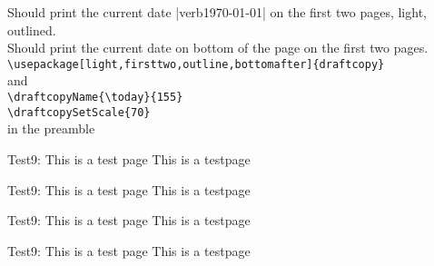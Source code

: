\documentclass[a5paper]{article}
\newcommand{\xx}{
Test9: This is a test page \thepage \vfill
This is a testpage \thepage \newpage
}
\begin{document}
Should print the current date |verb\today| on the
first two pages, light, outlined.\\
Should print the current date on bottom of the page on the first
two pages.\\
\verb|\usepackage[light,firsttwo,outline,bottomafter]{draftcopy}|\\
and \\
\verb|\draftcopyName{\today}{155}|\\
\verb|\draftcopySetScale{70}|\\
in the preamble
\xx\xx\xx\xx
\end{document}
